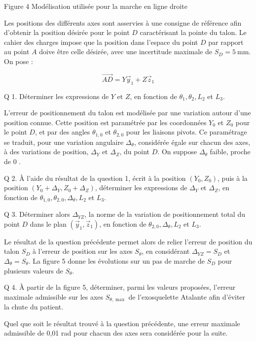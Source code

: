 \documentclass[10pt]{article}
\begin{document}
Figure 4 Modélisation utilisée pour la marche en ligne droite

Les positions des différents axes sont asservies à une consigne de référence afin d'obtenir la position désirée pour le point $D$ caractérisant la pointe du talon. Le cahier des charges impose que la position dans l'espace du point $D$ par rapport au point $A$ doive être celle désirée, avec une incertitude maximale de $S_{D}=5 \mathrm{~mm}$. On pose :

$$
\overrightarrow{A D}=Y \vec{y}_{1}+Z \vec{z}_{1}
$$

Q 1. Déterminer les expressions de $Y$ et $Z$, en fonction de $\theta_{1}, \theta_{2}, L_{2}$ et $L_{3}$.

L'erreur de positionnement du talon est modélisée par une variation autour d'une position connue. Cette position est paramétrée par les coordonnées $Y_{0}$ et $Z_{0}$ pour le point $D$, et par des angles $\theta_{1,0}$ et $\theta_{2,0}$ pour les liaisons pivots. Ce paramétrage se traduit, pour une variation angulaire $\Delta_{\theta}$, considérée égale sur chacun des axes, à des variations de position, $\Delta_{Y}$ et $\Delta_{Z}$, du point $D$. On suppose $\Delta_{\theta}$ faible, proche de 0 .

Q 2. À l'aide du résultat de la question 1, écrit à la position $\left(Y_{0}, Z_{0}\right)$, puis à la position $\left(Y_{0}+\Delta_{Y}, Z_{0}+\Delta_{Z}\right)$, déterminer les expressions de $\Delta_{Y}$ et $\Delta_{Z}$, en fonction de $\theta_{1,0}, \theta_{2,0}, \Delta_{\theta}, L_{2}$ et $L_{3}$.

Q 3. Déterminer alors $\Delta_{Y Z}$, la norme de la variation de positionnement total du point $D$ dans le plan $\left(\vec{y}_{1}, \vec{z}_{1}\right)$, en fonction de $\theta_{2,0}, \Delta_{\theta}, L_{2}$ et $L_{3}$.

Le résultat de la question précédente permet alors de relier l'erreur de position du talon $S_{D}$ à l'erreur de position sur les axes $S_{\theta}$, en considérant $\Delta_{Y Z}=S_{D}$ et $\Delta_{\theta}=S_{\theta}$. La figure 5 donne les évolutions sur un pas de marche de $S_{D}$ pour plusieurs valeurs de $S_{\theta}$.

Q 4. À partir de la figure 5, déterminer, parmi les valeurs proposées, l'erreur maximale admissible sur les axes $S_{\theta, \max }$ de l'exosquelette Atalante afin d'éviter la chute du patient.

Quel que soit le résultat trouvé à la question précédente, une erreur maximale admissible de 0,01 rad pour chacun des axes sera considérée pour la suite.
\end{document}
